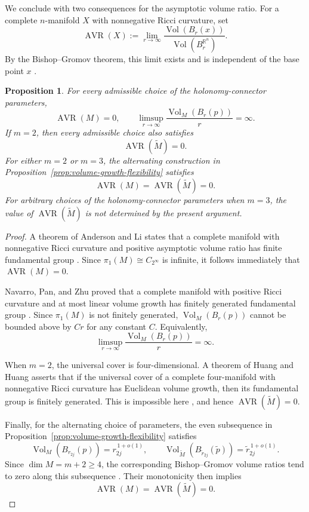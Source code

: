 \documentclass[11pt,reqno]{amsart}
\newtheorem{proposition}[theorem]{Proposition}
\theoremstyle{definition}
\numberwithin{equation}{section}
\newcommand{\CPrufer}{C_{2^\infty}}
\begin{document}
We conclude with two consequences for the asymptotic volume ratio.  For
a complete \(n\)-manifold \(X\) with nonnegative Ricci curvature, set
\[
 \operatorname{AVR}(X)
 :=
 \lim_{r\to\infty}
 \frac{\operatorname{Vol}(B_r(x))}
 {\operatorname{Vol}(B_r^{\mathbb R^n})}.
\]
By the Bishop--Gromov theorem, this limit exists and is independent of
the base point \(x\) \cite[Chapter~9]{Petersen2016}.

\begin{proposition}
\label{prop:volume-consequences}
For every admissible choice of the holonomy-connector parameters,
\[
 \operatorname{AVR}(M)=0,
 \qquad
 \limsup_{r\to\infty}
 \frac{\operatorname{Vol}_M(B_r(p))}{r}
 =\infty.
 \tag{8.28}\label{eq:base-avr-linear}
\]
If \(m=2\), then every admissible choice also satisfies
\[
 \operatorname{AVR}(\widetilde M)=0.
 \tag{8.29}\label{eq:cover-avr-dim4}
\]
For either \(m=2\) or \(m=3\), the alternating construction in
Proposition~\ref{prop:volume-growth-flexibility} satisfies
\[
 \operatorname{AVR}(M)
 =
 \operatorname{AVR}(\widetilde M)
 =0.
 \tag{8.30}\label{eq:alternating-avr}
\]
For arbitrary choices of the holonomy-connector parameters when \(m=3\), the
value of \(\operatorname{AVR}(\widetilde M)\) is not determined by the
present argument.
\end{proposition}

\begin{proof}
A theorem of Anderson and Li states that a complete manifold with
nonnegative Ricci curvature and positive asymptotic volume ratio has
finite fundamental group \cite{AndersonTopology1990,Li1986}.  Since
\(\pi_1(M)\cong\CPrufer\) is infinite, it follows immediately that
\(\operatorname{AVR}(M)=0\).

Navarro, Pan, and Zhu proved that a complete manifold with positive
Ricci curvature and at most linear volume growth has finitely generated
fundamental group \cite{NavarroPanZhu2024}.  Since \(\pi_1(M)\) is not
finitely generated,
\(\operatorname{Vol}_M(B_r(p))\) cannot be bounded above by \(Cr\) for
any constant \(C\).  Equivalently,
\[
 \limsup_{r\to\infty}
 \frac{\operatorname{Vol}_M(B_r(p))}{r}
 =\infty.
\]

When \(m=2\), the universal cover is four-dimensional.  A theorem of
Huang and Huang asserts that if the universal cover of a complete
four-manifold with nonnegative Ricci curvature has Euclidean volume
growth, then its fundamental group is finitely generated.  This is
impossible here \cite{HuangHuang2025}, and hence
\(\operatorname{AVR}(\widetilde M)=0\).

Finally, for the alternating choice of parameters, the even subsequence
in Proposition~\ref{prop:volume-growth-flexibility} satisfies
\[
 \operatorname{Vol}_M(B_{r_{2j}}(p))
 =r_{2j}^{\,1+o(1)},
 \qquad
 \operatorname{Vol}_{\widetilde M}
 (B_{\widetilde r_{2j}}(\widetilde p))
 =\widetilde r_{2j}^{\,1+o(1)}.
\]
Since \(\dim M=m+2\ge4\), the corresponding Bishop--Gromov volume ratios
tend to zero along this subsequence
\cite[Chapter~9]{Petersen2016}.  Their monotonicity then implies
\[
 \operatorname{AVR}(M)
 =
 \operatorname{AVR}(\widetilde M)
 =0.
\]
\end{proof}
\end{document}
